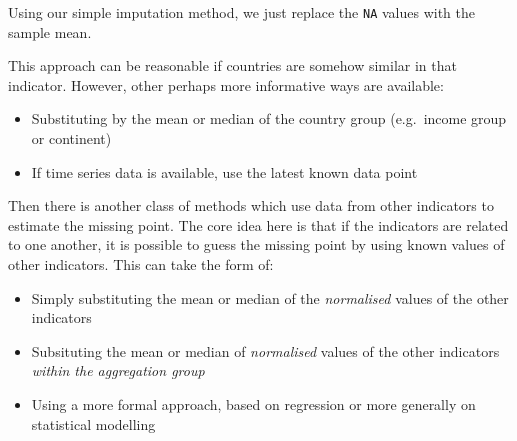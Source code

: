 \documentclass[
]{book}
\newenvironment{Shaded}{\begin{snugshade}}{\end{snugshade}}
\newcommand{\AttributeTok}[1]{\textcolor[rgb]{0.77,0.63,0.00}{#1}}
\newcommand{\DecValTok}[1]{\textcolor[rgb]{0.00,0.00,0.81}{#1}}
\newcommand{\DocumentationTok}[1]{\textcolor[rgb]{0.56,0.35,0.01}{\textbf{\textit{#1}}}}
\newcommand{\FunctionTok}[1]{\textcolor[rgb]{0.00,0.00,0.00}{#1}}
\newcommand{\NormalTok}[1]{#1}
\newcommand{\OtherTok}[1]{\textcolor[rgb]{0.56,0.35,0.01}{#1}}
\newcommand{\SpecialCharTok}[1]{\textcolor[rgb]{0.00,0.00,0.00}{#1}}
\providecommand{\tightlist}{%
  \setlength{\itemsep}{0pt}\setlength{\parskip}{0pt}}
\begin{document}
Using our simple imputation method, we just replace the \texttt{NA} values with the sample mean.

\begin{Shaded}
\end{Shaded}

This approach can be reasonable if countries are somehow similar in that indicator. However, other perhaps more informative ways are available:

\begin{itemize}
\tightlist
\item
  Substituting by the mean or median of the country group (e.g.~income group or continent)
\item
  If time series data is available, use the latest known data point
\end{itemize}

Then there is another class of methods which use data from other indicators to estimate the missing point. The core idea here is that if the indicators are related to one another, it is possible to guess the missing point by using known values of other indicators. This can take the form of:

\begin{itemize}
\tightlist
\item
  Simply substituting the mean or median of the \emph{normalised} values of the other indicators
\item
  Subsituting the mean or median of \emph{normalised} values of the other indicators \emph{within the aggregation group}
\item
  Using a more formal approach, based on regression or more generally on statistical modelling
\end{itemize}
\end{document}
